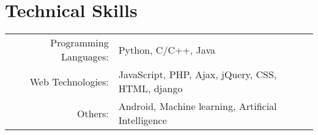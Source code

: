 \section{Technical Skills}
\renewcommand{\arraystretch}{1}%
\begin{tabular}{rl}

Programming Languages: &  Python, C/C++, Java\\
Web Technologies: & JavaScript, PHP, Ajax, jQuery, CSS, HTML, django\\
Others: & Android, Machine learning, Artificial Intelligence \\
\end{tabular}
\vspace{5pt}
